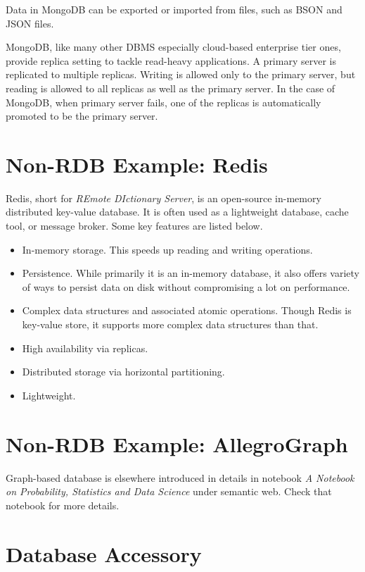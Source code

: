 Data in MongoDB can be exported or imported from files, such as BSON and JSON files.

MongoDB, like many other DBMS especially cloud-based enterprise tier ones, provide replica setting to tackle read-heavy applications. A primary server is replicated to multiple replicas. Writing is allowed only to the primary server, but reading is allowed to all replicas as well as the primary server. In the case of MongoDB, when primary server fails, one of the replicas is automatically promoted to be the primary server.

\section{Non-RDB Example: Redis}

Redis, short for \textit{REmote DIctionary Server}, is an open-source in-memory distributed key-value database. It is often used as a lightweight database, cache tool, or message broker. Some key features are listed below.

\begin{itemize}
\item In-memory storage. This speeds up reading and writing operations.
\item Persistence. While primarily it is an in-memory database, it also offers variety of ways to persist data on disk without compromising a lot on performance.
\item Complex data structures and associated atomic operations. Though Redis is key-value store, it supports more complex data structures than that.
\item High availability via replicas.
\item Distributed storage via horizontal partitioning.
\item Lightweight.
\end{itemize}

\section{Non-RDB Example: AllegroGraph}

Graph-based database is elsewhere introduced in details in notebook \textit{A Notebook on Probability, Statistics and Data Science} under semantic web. Check that notebook for more details.

\section{Database Accessory}

